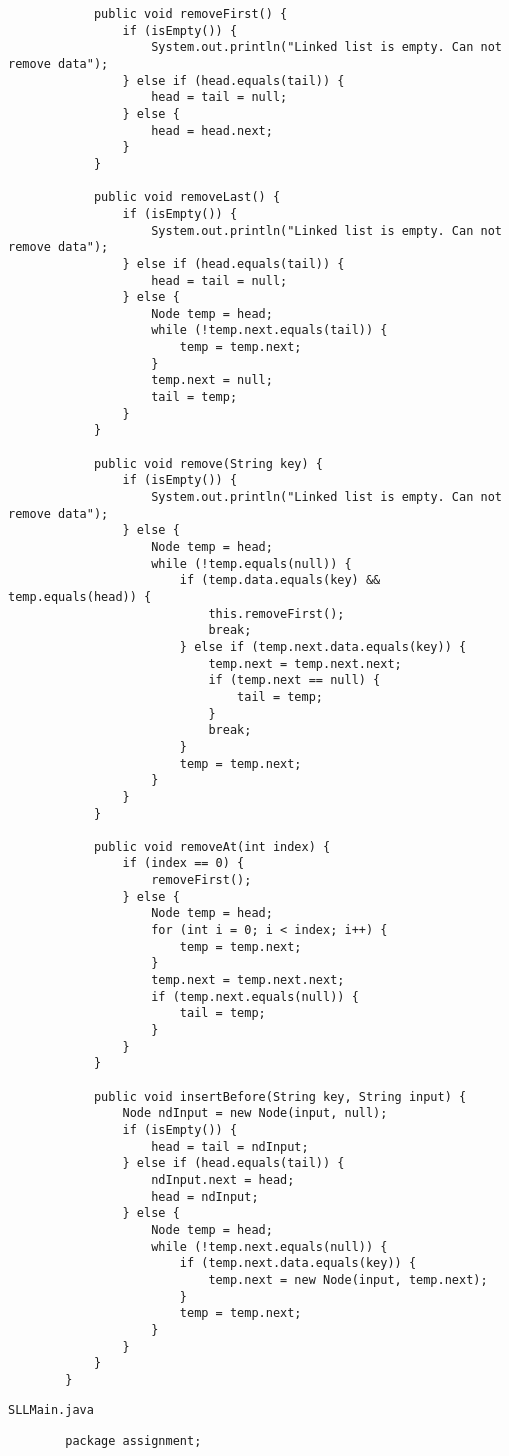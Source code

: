 \documentclass[12pt,titlepage]{article}
\begin{document}
\begin{enumerate}
\begin{verbatim}
            public void removeFirst() {
                if (isEmpty()) {
                    System.out.println("Linked list is empty. Can not remove data");
                } else if (head.equals(tail)) {
                    head = tail = null;
                } else {
                    head = head.next;
                }
            }

            public void removeLast() {
                if (isEmpty()) {
                    System.out.println("Linked list is empty. Can not remove data");
                } else if (head.equals(tail)) {
                    head = tail = null;
                } else {
                    Node temp = head;
                    while (!temp.next.equals(tail)) {
                        temp = temp.next;
                    }
                    temp.next = null;
                    tail = temp;
                }
            }

            public void remove(String key) {
                if (isEmpty()) {
                    System.out.println("Linked list is empty. Can not remove data");
                } else {
                    Node temp = head;
                    while (!temp.equals(null)) {
                        if (temp.data.equals(key) && temp.equals(head)) {
                            this.removeFirst();
                            break;
                        } else if (temp.next.data.equals(key)) {
                            temp.next = temp.next.next;
                            if (temp.next == null) {
                                tail = temp;
                            }
                            break;
                        }
                        temp = temp.next;
                    }
                }
            }

            public void removeAt(int index) {
                if (index == 0) {
                    removeFirst();
                } else {
                    Node temp = head;
                    for (int i = 0; i < index; i++) {
                        temp = temp.next;
                    }
                    temp.next = temp.next.next;
                    if (temp.next.equals(null)) {
                        tail = temp;
                    }
                }
            }

            public void insertBefore(String key, String input) {
                Node ndInput = new Node(input, null);
                if (isEmpty()) {
                    head = tail = ndInput;
                } else if (head.equals(tail)) {
                    ndInput.next = head;
                    head = ndInput;
                } else {
                    Node temp = head;
                    while (!temp.next.equals(null)) {
                        if (temp.next.data.equals(key)) {
                            temp.next = new Node(input, temp.next);
                        }
                        temp = temp.next;
                    }
                }
            }
        }
    \end{verbatim}
    \texttt{SLLMain.java}
    \begin{verbatim}
        package assignment;


\end{verbatim}
\end{enumerate}
\end{document}
